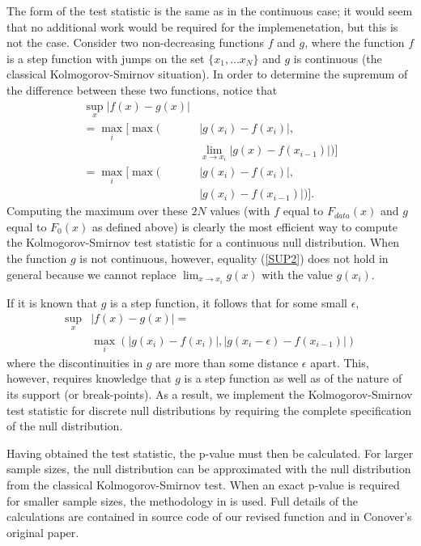 The form of the test statistic is the same as in the
continuous case; it would seem that no additional work would be required
for the implemenetation, but this is not the case.
Consider two non-decreasing functions $f$ and $g$, where the function $f$ is a step function with jumps on the set $\{x_1, \ldots x_N \}$ and $g$
is continuous (the classical Kolmogorov-Smirnov situation).
In order to determine the supremum of the difference between
these two functions, notice that
\begin{align}
\sup_x \left| f(x) - g(x) \right| &  \nonumber  \\
       =  \max_i \bigg[ \max\bigg(  & \left|g(x_i) - f(x_i) \right|, \nonumber \\
& \lim_{x \rightarrow x_i} \left| g(x) - f(x_{i-1})
   \right| \bigg) \bigg] \label{SUP1}\\
=  \max_i \bigg[\max \bigg( & \left|g(x_i) - f(x_i) \right|, \nonumber \\
& \left| g(x_i) - f(x_{i-1}) \right| \bigg) \bigg]. \label{SUP2}
\end{align}
Computing the maximum over these $2N$
values (with $f$ equal to
$F_{data}(x)$ and $g$ equal to $F_0(x)$ as defined above) is clearly the 
most efficient way to compute the Kolmogorov-Smirnov test statistic for
a continuous null distribution. When the function $g$ is not
continuous, however, equality (\ref{SUP2}) does not hold in general because 
we cannot replace $\lim_{x\rightarrow x_i} g(x)$ with the value $g(x_i)$. 

If it is known that $g$ is a step function, it follows that
for some small $\epsilon$,
\begin{align}
\sup_x &\left| f(x)- g(x) \right| =  \nonumber \\
        & \max_i \left( \left|g(x_i) - f(x_i) \right|, 
    \left| g(x_i - \epsilon) - f(x_{i-1}) \right| \right) \label{epsilon}
\end{align}
where the discontinuities in $g$ are more than some distance $\epsilon$ apart. 
This, however, requires knowledge that $g$ is a step function as well as of
the nature of its support (or break-points).  As a result,
we implement the Kolmogorov-Smirnov test statistic for discrete null
distributions by requiring the complete specification of the null distribution.


Having obtained the test statistic, the p-value must then be calculated. 
For larger sample sizes, the null distribution can be approximated
with the null distribution from the classical Kolmogorov-Smirnov test. 
When an exact p-value is required for
smaller sample sizes, the methodology in \citet{Conover1972} is used. 
Full details of the calculations are contained in source code
of our revised function  and in Conover's original paper. 


